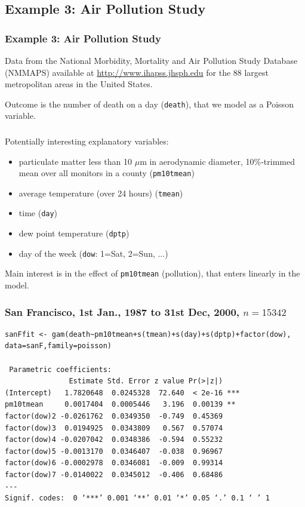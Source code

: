 \documentclass{beamer}
\newcommand{\bs}{\bigskip}
\begin{document}
\subsection{Example 3: Air Pollution Study}

\begin{frame}
\frametitle{Example 3: Air Pollution Study}

Data from the National Morbidity, Mortality and Air Pollution Study Database
(NMMAPS) available at \url{http://www.ihapss.jhsph.edu} for
the 88 largest metropolitan areas in the United States.

\bs

Outcome is the number of death on a day (\texttt{death}), that we
model as a Poisson variable.
\end{frame}

\begin{frame}
\frametitle{}

Potentially interesting explanatory variables:
\begin{itemize}
\item particulate matter less than 10 $\mu$m in aerodynamic diameter,
10\%-trimmed mean over all monitors in a county (\texttt{pm10tmean})
\item average temperature (over 24 hours) (\texttt{tmean})
\item time (\texttt{day})
\item dew point temperature (\texttt{dptp})
\item day of the week (\texttt{dow}: 1=Sat, 2=Sun, ...)
\end{itemize}

\bs

Main interest is in the effect of \texttt{pm10tmean} (pollution), that enters
linearly in the model.
\end{frame}


\begin{frame}[fragile]
\frametitle{San Francisco, 1st Jan., 1987 to 31st Dec, 2000,
$n=15342$}

{\scriptsize
\begin{verbatim}
sanFfit <- gam(death~pm10tmean+s(tmean)+s(day)+s(dptp)+factor(dow),
data=sanF,family=poisson)

 Parametric coefficients:
               Estimate Std. Error z value Pr(>|z|)    
(Intercept)   1.7820648  0.0245328  72.640  < 2e-16 ***
pm10tmean     0.0017404  0.0005446   3.196  0.00139 ** 
factor(dow)2 -0.0261762  0.0349350  -0.749  0.45369    
factor(dow)3  0.0194925  0.0343809   0.567  0.57074    
factor(dow)4 -0.0207042  0.0348386  -0.594  0.55232    
factor(dow)5 -0.0013170  0.0346407  -0.038  0.96967    
factor(dow)6 -0.0002978  0.0346081  -0.009  0.99314    
factor(dow)7 -0.0140022  0.0345012  -0.406  0.68486    
---
Signif. codes:  0 ‘***’ 0.001 ‘**’ 0.01 ‘*’ 0.05 ‘.’ 0.1 ‘ ’ 1
\end{verbatim}
}
\end{frame}
\end{document}
